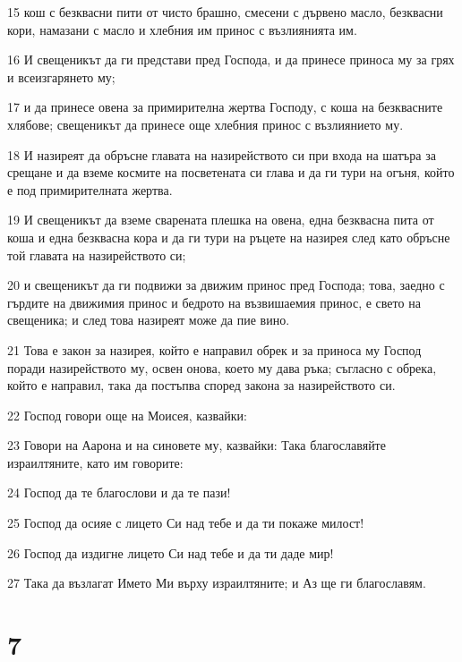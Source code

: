 \par 15 кош с безквасни пити от чисто брашно, смесени с дървено масло, безквасни кори, намазани с масло и хлебния им принос с възлиянията им.
\par 16 И свещеникът да ги представи пред Господа, и да принесе приноса му за грях и всеизгарянето му;
\par 17 и да принесе овена за примирителна жертва Господу, с коша на безквасните хлябове; свещеникът да принесе още хлебния принос с възлиянието му.
\par 18 И назиреят да обръсне главата на назирейството си при входа на шатъра за срещане и да вземе космите на посветената си глава и да ги тури на огъня, който е под примирителната жертва.
\par 19 И свещеникът да вземе сварената плешка на овена, една безквасна пита от коша и една безквасна кора и да ги тури на ръцете на назирея след като обръсне той главата на назирейството си;
\par 20 и свещеникът да ги подвижи за движим принос пред Господа; това, заедно с гърдите на движимия принос и бедрото на възвишаемия принос, е свето на свещеника; и след това назиреят може да пие вино.
\par 21 Това е закон за назирея, който е направил обрек и за приноса му Господ поради назирейството му, освен онова, което му дава ръка; съгласно с обрека, който е направил, така да постъпва според закона за назирейството си.
\par 22 Господ говори още на Моисея, казвайки:
\par 23 Говори на Аарона и на синовете му, казвайки: Така благославяйте израилтяните, като им говорите:
\par 24 Господ да те благослови и да те пази!
\par 25 Господ да осияе с лицето Си над тебе и да ти покаже милост!
\par 26 Господ да издигне лицето Си над тебе и да ти даде мир!
\par 27 Така да възлагат Името Ми върху израилтяните; и Аз ще ги благославям.

\chapter{7}

